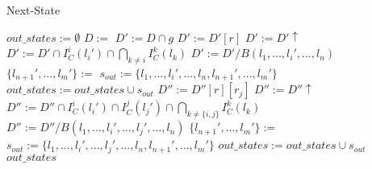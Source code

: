 \begin{algorithm}
\caption{Next-State}\label{alg:successor-gen}
\begin{algorithmic}[1]
	\State $out\_states := \emptyset$	
	\State $D := $		
	\State {}
	 \label{lst:line:alllocs}
		 \label{lst:line:alltrans}
			\State $D' := D \cap g$
			\label{lst:line:empty1}
				 \label{lst:line:normaltrans}
					\State $D' := D'[r]$
					\State $D' := D'\uparrow$
					\State $D' := D' \cap I_C^i(l_i') \cap \bigcap_{k \neq i} I_C^k(l_k)$
					\label{lst:line:empty2}
						\State $D' := D'/ B(l_1,...,l_i',...,l_n)$
						\State \Call{ReduceZero}{$D'$}
						\State $\{l_{n+1}',...,l_m'\} := $
						\State $s_{out} := \{l_1,...,l_i',...,l_n,l_{n+1}',...,l_m'\}$
						\State $out\_states := out\_states \cup s_{out}$
					\EndIf \label{lst:line:endnormaltrans}
				\Else
					 \label{lst:line:synctrans}
						\label{lst:line:alllocs2}
								\label{lst:line:empty3}
									\State $D'' := D''[r][r_j]$
									\State $D'' := D''\uparrow$
									\State $D'' := D'' \cap I_C^i(l_i') \cap I_C^j(l_j') \cap \bigcap_{k \neq \{i,j\}} I_C^k(l_k)$
									\label{lst:line:empty4}
										\State $D''	:= D''/ B(l_1,...,l_i',...,l_j',...,l_n)$						
										\State {}		
										\State $\{l_{n+1}',...,l_m'\} := $
										\State $s_{out} := \{l_1,...,l_i',...,l_j',...,l_n,l_{n+1}',...,l_m'\}$
										\State $out\_states := out\_states \cup s_{out}$
									\EndIf								
								\EndIf							
							\EndFor
						\EndFor \label{lst:line:endsynctrans}
					\EndIf
				\EndIf
			\EndIf
		\EndFor
	\EndFor
	\State \Return $out\_states$
\EndProcedure
\end{algorithmic}
\end{algorithm}

